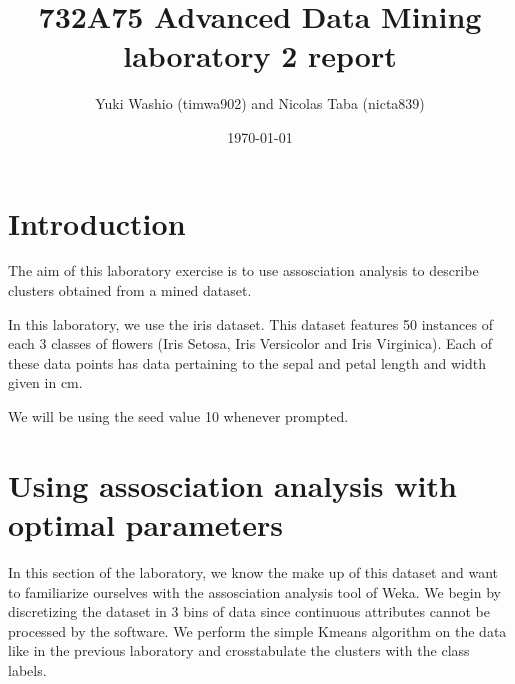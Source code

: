 \documentclass[letterpaper,12pt]{article}
\begin{document}
\title{732A75 Advanced Data Mining laboratory 2 report}
\author{Yuki Washio (timwa902) and Nicolas Taba (nicta839)}
\date{\today}
\maketitle



\section{Introduction}

The aim of this laboratory exercise is to use assosciation analysis to describe clusters obtained from a mined dataset.

In this laboratory, we use the iris dataset. This dataset features 50 instances of each 3 classes of flowers (Iris Setosa, Iris Versicolor and Iris Virginica). Each of these data points has data pertaining to the sepal and petal length and width given in cm.

We will be using the seed value 10 whenever prompted.


\section{Using assosciation analysis with optimal parameters}

In this section of the laboratory, we know the make up of this dataset and want to familiarize ourselves with the assosciation analysis tool of Weka. We begin by discretizing the dataset in 3 bins of data since continuous attributes cannot be processed by the software. We perform the simple Kmeans algorithm on the data like in the previous laboratory and crosstabulate the clusters with the class labels.
\end{document}
